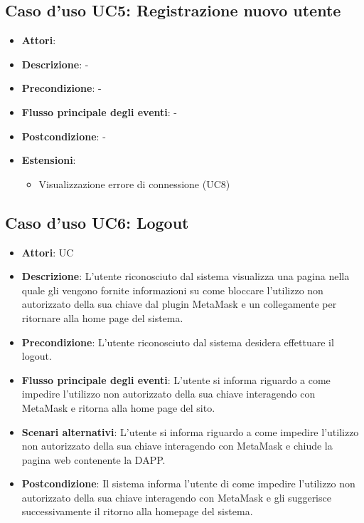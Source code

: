 \subsection{Caso d'uso \hypertarget{UC5}{UC5}: Registrazione nuovo utente}
\begin{itemize}
\item \textbf{Attori}: 
\item \textbf{Descrizione}: -
\item \textbf{Precondizione}: -
\item \textbf{Flusso principale degli eventi}: -
\item \textbf{Postcondizione}: -
\item \textbf{Estensioni}:
\begin{itemize}
\item Visualizzazione errore di connessione (UC8)
\end{itemize}
\end{itemize}
\subsection{Caso d'uso \hypertarget{UC6}{UC6}: Logout}
\begin{itemize}
\item \textbf{Attori}: UC
\item \textbf{Descrizione}: L'utente riconosciuto dal sistema visualizza una pagina nella quale gli vengono fornite informazioni su come bloccare l'utilizzo non autorizzato della sua chiave dal plugin MetaMask e un collegamente per ritornare alla home page del sistema.
\item \textbf{Precondizione}: L'utente riconosciuto dal sistema desidera effettuare il logout.
\item \textbf{Flusso principale degli eventi}: L'utente si informa riguardo a come impedire l'utilizzo non autorizzato della sua chiave interagendo con MetaMask e ritorna alla home page del sito.
\item \textbf{Scenari alternativi}: L'utente si informa riguardo a come impedire l'utilizzo non autorizzato della sua chiave interagendo con MetaMask e chiude la pagina web contenente la DAPP.
\item \textbf{Postcondizione}: Il sistema informa l'utente di come impedire l'utilizzo non autorizzato della sua chiave interagendo con MetaMask e gli suggerisce successivamente il ritorno alla homepage del sistema.
\end{itemize}
